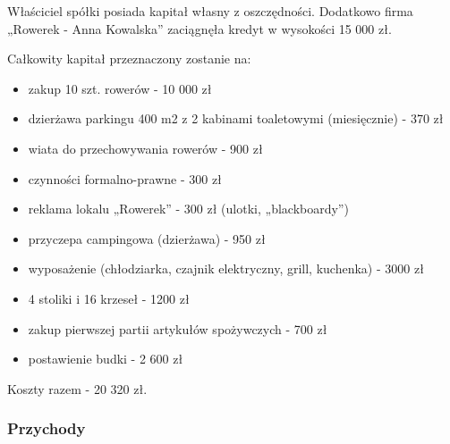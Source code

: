 \documentclass{sprawozdanie-agh}
\begin{document}
		Właściciel spółki posiada kapitał własny z oszczędności.
		Dodatkowo firma „Rowerek - Anna Kowalska'' zaciągnęła kredyt w wysokości 15 000 zł. 
		
		Całkowity kapitał przeznaczony zostanie na:
		\begin{itemize}
			\item zakup 10 szt. rowerów	- 10 000  zł
			\item dzierżawa parkingu 400 m2 z 2 kabinami toaletowymi (miesięcznie) - 370 zł
			\item wiata do przechowywania rowerów - 900 zł
			\item czynności formalno-prawne	- 300 zł
			\item reklama lokalu „Rowerek'' - 300 zł (ulotki, „blackboardy'')
			\item przyczepa campingowa (dzierżawa)	-  950 zł
			\item wyposażenie (chłodziarka, czajnik	elektryczny, grill, kuchenka) - 3000 zł
			\item 4 stoliki i 16 krzeseł - 1200 zł
			\item zakup pierwszej partii artykułów spożywczych - 700 zł
			\item postawienie budki - 2 600 zł
		\end{itemize}
		
		Koszty razem - 20 320 zł.
		\subsubsection{Przychody}
\end{document}
